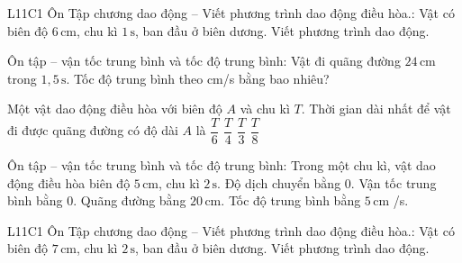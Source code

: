 \begin{bt}
L11C1 Ôn Tập chương dao động – Viết phương trình dao động điều hòa.: Vật có biên độ $6\,\text{cm}$, chu kì $1\,\text{s}$, ban đầu ở biên dương. Viết phương trình dao động.
\end{bt}

\begin{ex}
Ôn tập – vận tốc trung bình và tốc độ trung bình: Vật đi quãng đường $24\,\text{cm}$ trong $1,5\,\text{s}$. Tốc độ trung bình theo cm/s bằng bao nhiêu?
\end{ex}

\begin{ex}
Một vật dao động điều hòa với biên độ $A$ và chu kì $T$. Thời gian dài nhất để vật đi được quãng đường có độ dài $A$ là
\choice
{$\dfrac{T}{6}$}
{$\dfrac{T}{4}$}
{\True $\dfrac{T}{3}$}
{$\dfrac{T}{8}$}
\end{ex}

\begin{ex}
Ôn tập – vận tốc trung bình và tốc độ trung bình: Trong một chu kì, vật dao động điều hòa biên độ $5\,\text{cm}$, chu kì $2\,\text{s}$.
\choiceTF
{\True Độ dịch chuyển bằng 0.}
{\True Vận tốc trung bình bằng 0.}
{\True Quãng đường bằng $20\,\text{cm}$.}
{Tốc độ trung bình bằng $5\,\text{cm}$ /s.}
\end{ex}

\begin{bt}
L11C1 Ôn Tập chương dao động – Viết phương trình dao động điều hòa.: Vật có biên độ $7\,\text{cm}$, chu kì $2\,\text{s}$, ban đầu ở biên dương. Viết phương trình dao động.
\end{bt}

